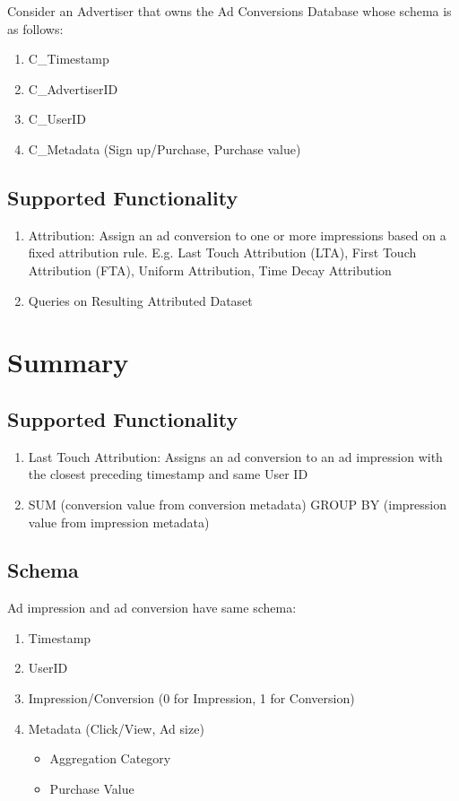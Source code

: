 Consider an Advertiser that owns the Ad Conversions Database whose schema is as follows:
\begin{enumerate}
    \item C\_Timestamp
    \item C\_AdvertiserID
    \item C\_UserID
    \item C\_Metadata (Sign up/Purchase, Purchase value)
\end{enumerate}

\subsection{Supported Functionality}
\begin{enumerate}
    \item Attribution: Assign an ad conversion to one or more impressions based on a fixed attribution rule. E.g. Last Touch Attribution (LTA), First Touch Attribution (FTA), Uniform Attribution, Time Decay Attribution
    \item Queries on Resulting Attributed Dataset 
\end{enumerate}

\section{Summary}


\subsection{Supported Functionality}
\begin{enumerate}
    \item Last Touch Attribution: Assigns an ad conversion to an ad impression with the closest preceding timestamp and same User ID 
    \item SUM (conversion value from conversion metadata) GROUP BY (impression value from impression metadata)
\end{enumerate}

\subsection{Schema}
Ad impression and ad conversion have same schema:
\begin{enumerate}
    \item Timestamp
    \item UserID
    \item Impression/Conversion (0 for Impression, 1 for Conversion)
    \item Metadata (Click/View, Ad size)
    \begin{itemize}
        \item Aggregation Category
        \item Purchase Value
    \end{itemize}
\end{enumerate}

